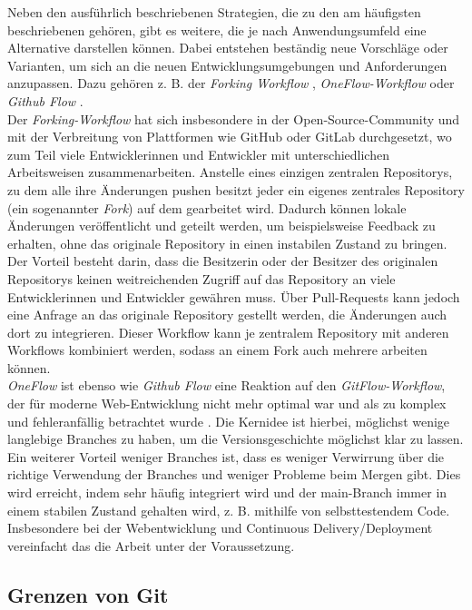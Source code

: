 Neben den ausführlich beschriebenen Strategien, die zu den am häufigsten beschriebenen gehören, gibt es weitere, die je nach Anwendungsumfeld eine Alternative darstellen können. Dabei entstehen beständig neue Vorschläge oder Varianten, um sich an die neuen Entwicklungsumgebungen und Anforderungen anzupassen. Dazu gehören z. B. der \emph{Forking Workflow} \cite{Antony:2021:5-Different:04}, \emph{OneFlow-Workflow} \cite{Ruka:2017:OneFlow:24} oder \emph{Github Flow} \cite{Chacon:2011:GitHub:63}.
\\
Der \emph{Forking-Workflow} hat sich insbesondere in der Open-Source-Community und mit der Verbreitung von Plattformen wie GitHub oder GitLab durchgesetzt, wo zum Teil viele Entwicklerinnen und Entwickler mit unterschiedlichen Arbeitsweisen zusammenarbeiten. Anstelle eines einzigen zentralen Repositorys, zu dem alle ihre Änderungen pushen besitzt jeder ein eigenes zentrales Repository (ein sogenannter \emph{Fork}) auf dem gearbeitet wird. Dadurch können lokale Änderungen veröffentlicht und geteilt werden, um beispielsweise Feedback zu erhalten, ohne das originale Repository in einen instabilen Zustand zu bringen. Der Vorteil besteht darin, dass die Besitzerin oder der Besitzer des originalen Repositorys keinen weitreichenden Zugriff auf das Repository an viele Entwicklerinnen und Entwickler gewähren muss. Über Pull-Requests kann jedoch eine Anfrage an das originale Repository gestellt werden, die Änderungen auch dort zu integrieren. Dieser Workflow kann je zentralem Repository mit anderen Workflows kombiniert werden, sodass an einem Fork auch mehrere arbeiten können.
\\
\emph{OneFlow} ist ebenso wie \emph{Github Flow} eine Reaktion auf den \emph{GitFlow-Workflow}, der für moderne Web-Entwicklung nicht mehr optimal war und als zu komplex und fehleranfällig betrachtet wurde \cite{Ruka:2015:GitFlow:46}\cite{Chacon:2011:GitHub:63}. Die Kernidee ist hierbei, möglichst wenige langlebige Branches zu haben, um die Versionsgeschichte möglichst klar zu lassen. Ein weiterer Vorteil weniger Branches ist, dass es weniger Verwirrung über die richtige Verwendung der Branches und weniger Probleme beim Mergen gibt. Dies wird erreicht, indem sehr häufig integriert wird und der main-Branch immer in einem stabilen Zustand gehalten wird, z. B. mithilfe von selbsttestendem Code. Insbesondere bei der Webentwicklung und Continuous Delivery/Deployment vereinfacht das die Arbeit unter der Voraussetzung.

\subsection{Grenzen von Git}

